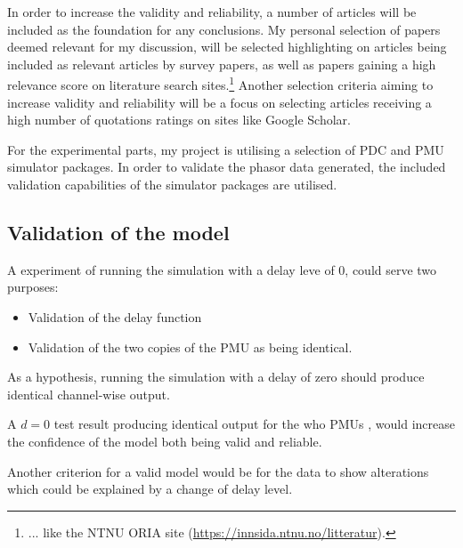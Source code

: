 In order to increase the validity and reliability, a number of articles will be included as the foundation for any conclusions. My personal selection of papers deemed relevant for my discussion, will be selected highlighting on articles being included as relevant articles by survey papers, as well as papers gaining a high relevance score on literature search sites.\footnote{... like the NTNU ORIA site (\url{https://innsida.ntnu.no/litteratur}).} Another selection criteria aiming to increase validity and reliability will be a focus on selecting articles receiving a high number of quotations ratings on sites like Google Scholar. %



For the experimental parts, my project is utilising a selection of PDC and PMU simulator packages. In order to validate the phasor data generated, the included validation capabilities of the simulator packages are utilised. 
\subsection{Validation of the model} \label{subsec:ModelValidation}
A experiment of running the simulation with a delay leve of 0, could serve two purposes:
\begin{itemize}
    \item Validation of the delay function
    \item Validation of the two copies of the PMU as being identical.
\end{itemize}
As a hypothesis, running the simulation with a delay of zero should produce identical channel-wise output.

A $d=0$ test result  producing identical output for the who PMUs , would increase the 
confidence of the model both being valid and reliable.

Another criterion for a valid model would be for the data to show alterations which could be explained by a change of delay level.



